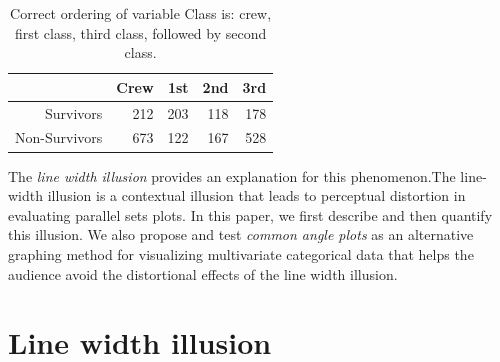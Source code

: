 \begin{table}
\begin{center}
\begin{tabular}{rrrrr}
& Crew & 1st & 2nd & 3rd \\ \hline
Survivors & 212 & 203 & 118 & 178\\
Non-Survivors & 673 & 122 & 167 &  528  
\end{tabular}
\caption{Correct ordering of variable Class is: crew, first class, third class, followed by second class. }
\end{center}
\end{table}
The \emph{line width illusion} provides an explanation for this phenomenon.The line-width illusion is a contextual illusion that leads to perceptual distortion in evaluating parallel sets plots. In this paper, we first describe and then quantify this illusion. We also propose and test \emph{common angle plots} as an alternative graphing method for visualizing multivariate categorical data that helps the audience avoid the distortional effects of the line width illusion.


%

\section{Line width illusion}




